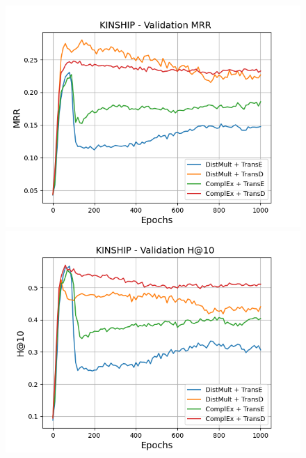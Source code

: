 \begin{figure}[H]
    \centering
    \begin{minipage}{.5\textwidth}
      \centering
      \includegraphics[width=\linewidth]{figures/results/gan_train/not_pretrained/uncertainty/max/entropy/kinship/1k_epochs/uncertainty_kinship_mrrs.png}
    \end{minipage}%
    \begin{minipage}{.5\textwidth}
      \centering
      \includegraphics[width=\linewidth]{figures/results/gan_train/not_pretrained/uncertainty/max/entropy/kinship/1k_epochs/uncertainty_kinship_hit10.png}
    \end{minipage}
    

\end{figure}
